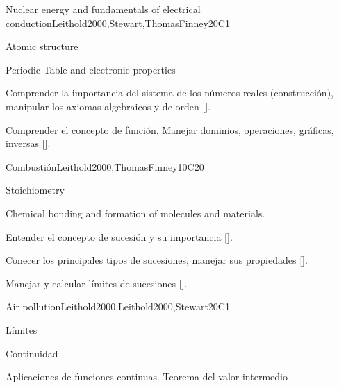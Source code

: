 \begin{syllabus}
\begin{unit}{}{Nuclear energy and fundamentals of electrical conduction}{Leithold2000,Stewart,ThomasFinney}{20}{C1}
   \begin{topics}
    \item Atomic structure
    \item Periodic Table and electronic properties
    \end{topics}

   \begin{learningoutcomes}
      \item Comprender la importancia del sistema de los números reales (construcción), manipular los axiomas algebraicos y de orden [\Assessment].
      \item Comprender el concepto de función. Manejar dominios, operaciones, gráficas, inversas [\Assessment].
      \end{learningoutcomes}
\end{unit}

\begin{unit}{}{Combustión}{Leithold2000,ThomasFinney}{10}{C20}
  
  \begin{topics}
    \item Stoichiometry
    \item Chemical bonding and formation of molecules and materials.   

  \end{topics}

   \begin{learningoutcomes}
      \item Entender el concepto de sucesión y su importancia [\Assessment].
      \item Conecer los principales tipos de sucesiones, manejar sus propiedades [\Assessment].
      \item Manejar y calcular límites de sucesiones [\Assessment].
      \end{learningoutcomes}
\end{unit}

\begin{unit}{}{Air pollution}{Leithold2000,Leithold2000,Stewart}{20}{C1}
   \begin{topics}
      \item Límites
      \item Continuidad
      \item Aplicaciones de funciones continuas. Teorema del valor intermedio
    \end{topics}


\end{unit}
\end{syllabus}

